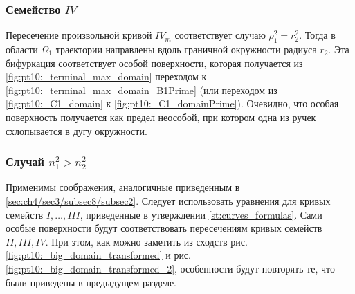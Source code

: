  \subsubsection{Семейство $IV$}
Пересечение произвольной кривой $IV_m$ соответствует случаю $\rho_1^2 = r_2^2$. Тогда в области $\Omega_1$ траектории направлены вдоль граничной окружности радиуса $r_2$. Эта бифуркация соответствует особой поверхности, которая получается из \ref{fig:pt10:_terminal_max_domain} переходом к \ref{fig:pt10:_terminal_max_domain_B1Prime} (или переходом из \ref{fig:pt10:_C1_domain} к \ref{fig:pt10:_C1_domainPrime}). Очевидно, что особая поверхность получается как предел неособой, при котором одна из ручек схлопывается в дугу окружности.


\subsubsection{Случай $n_1^2 > n_2^2$}
Применимы соображения, аналогичные приведенным в \ref{sec:ch4/sec3/subsec8/subsec2}. Следует использовать уравнения для кривых семейств $I, \ldots, III$, приведенные в утверждении \ref{st:curves_formulas}. Сами особые поверхности будут соответствовать пересечениям кривых семейств $II, III, IV$. При этом, как можно заметить из сходств рис. \ref{fig:pt10:_big_domain_transformed} и  рис. \ref{fig:pt10:_big_domain_transformed_2}, особенности будут повторять те, что были  приведены в предыдущем разделе.
